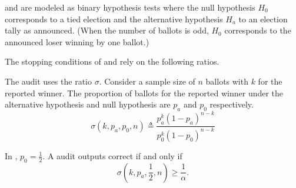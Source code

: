 


\BRAVO and \Minerva are modeled as binary hypothesis tests where the null hypothesis $H_0$ corresponds to a tied election and the alternative hypothesis $H_a$ to an election tally as announced. 
(When the number of ballots is odd, $H_0$ corresponds to the announced loser winning by one ballot.)


The stopping conditions of \BRAVO and \Minerva rely on the following ratios.

\begin{definition} \label{def:bravo-ratio} The \BRAVO audit uses the ratio $\sigma$. Consider a sample size of $n$ ballots with $k$ for the reported winner. The proportion of ballots for the reported winner under the alternative hypothesis and null hypothesis are $p_a$ and $p_0$ respectively.
\begin{equation}
    \sigma(k, p_a, p_0, n) \triangleq \frac{p_a^{k} (1-p_a)^{n-k}}{p_0^{k} (1-p_0)^{n-k}} 
    \label{eqn:bravoratio}
\end{equation}
\end{definition}

In \BRAVO, $p_0=\frac{1}{2}$. A \BRAVO audit outputs correct if and only if
$$\sigma(k,p_a,\frac{1}{2},n)\ge \frac{1}{\alpha}.$$

